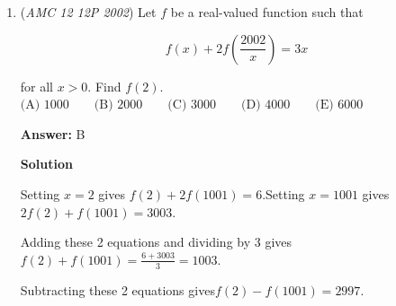 \begin{enumerate}
 It is clear that triangles $AFB$ and $EGC$ are congruent $30-60-90$ triangles. Therefore, $AF = EG = \frac{3}{2}$ and $BF = CG = \frac{3\sqrt{3}}{2}$.

 Therefore, $AE = AF + FG + GC = 4 + (2)(\frac{3}{2}) = 7$ and the area of trapezoid $ABCE$ is $(\frac{1}{2})(4+7)(\frac{3\sqrt{3}}{2}) = \frac{33\sqrt{3}}{4}$.

 It remains to find the area of triangle $AED$, which is $(\frac{1}{2})(AE)(ED)(\sin 120^{\circ}) = (\frac{1}{2})(7)(2)(\frac{\sqrt{3}}{2}) = \frac{7\sqrt{3}}{2}$.

 Therefore, the total area of quadrilateral $ABCD$ is $\frac{33\sqrt{3}}{4} + \frac{7\sqrt{3}}{2} = \boxed{\textbf{(D) }\frac{47\sqrt{3}}{4}}$.

 



\textbf{Solution 2}

Extend $AB$ and $CD$ to meet at $E$. Then triangle $BEC$ is equilateral, as $\angle EBC = \angle ECB = 60^{\circ}$. Thus, $BC = CE = EB = 4$. 

 Note $AE = AB + BE = 7$ and $DE = DC + CE = 9$ Then, the area of triangle $ADE$ is $\frac {1} {2} \cdot AE \cdot DE \cdot \sin{60^{\circ}} = \frac {63\sqrt{3}} {4}$. As triangle $BEC$ is equilateral, its area is $\frac {\sqrt{3}} {4} \cdot 4^2 = \frac {16\sqrt{3}} {4}$. 

 The area of $ABCD$ is the area of triangle $ADE$ minus the area of triangle $BEC$, or $\boxed{\textbf{(D) }\frac{47\sqrt{3}}{4}}$.

 


	\item (\textit{AMC 12 12P 2002}) Let $f$ be a real-valued function such that


 
 \[f(x) + 2f(\frac{2002}{x}) = 3x\]


 for all $x>0.$ Find $f(2).$
$\text{(A) }1000 \qquad \text{(B) }2000 \qquad \text{(C) }3000 \qquad \text{(D) }4000 \qquad \text{(E) }6000$

 \textbf{Answer: }B



\textbf{Solution}

Setting $x = 2$ gives $f(2) + 2f(1001) = 6$.Setting $x = 1001$ gives $2f(2) + f(1001) = 3003$.

 Adding these 2 equations and dividing by 3 gives$f(2) + f(1001) = \frac{6+3003}{3} = 1003$.

 Subtracting these 2 equations gives$f(2) - f(1001) = 2997$.


\end{enumerate}
